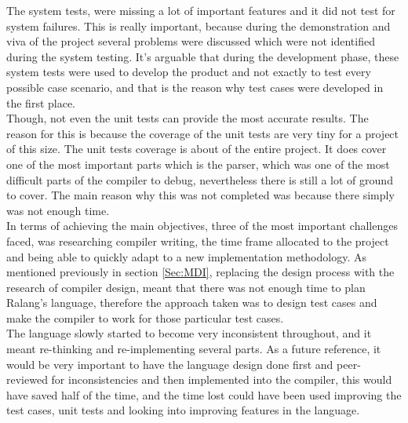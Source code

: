 \documentclass[a4paper]{article}
\begin{document}
	The system tests, were missing a lot of important features and it did not test for system failures. This is really important, because during the demonstration and viva of the project several problems were discussed which were not identified during the system testing. It's arguable that during the development phase, these system tests were used to develop the product and not exactly to test every possible case scenario, and that is the reason why test cases were developed in the first place.\\
	
	Though, not even the unit tests can provide the most accurate results. The reason for this is because the coverage of the unit tests are very tiny for a project of this size. The unit tests coverage is about  of the entire project. It does cover one of the most important parts which is the parser, which was one of the most difficult parts of the compiler to debug, nevertheless there is still a lot of ground to cover. The main reason why this was not completed was because there simply was not enough time.\\
	
	In terms of achieving the main objectives, three of the most important challenges faced, was researching compiler writing, the time frame allocated to the project and being able to quickly adapt to a new implementation methodology. As mentioned previously in section \ref{Sec:MDI}, replacing the design process with the research of compiler design, meant that there was not enough time to plan Ralang's language, therefore the approach taken was to design test cases and make the compiler to work for those particular test cases.\\
	
	The language slowly started to become very inconsistent throughout, and it meant re-thinking and re-implementing several parts. As a future reference, it would be very important to have the language design done first and peer-reviewed for inconsistencies and then implemented into the compiler, this would have saved half of the time, and the time lost could have been used improving the test cases, unit tests and looking into improving features in the language.\\
	
\end{document}
